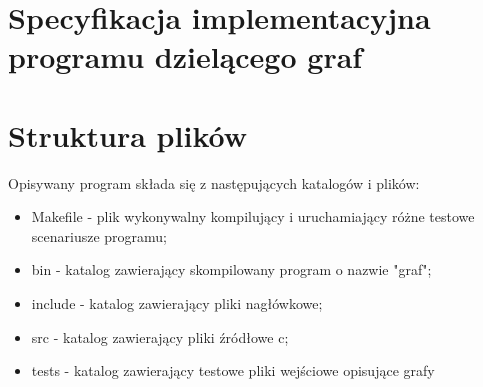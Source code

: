 \documentclass{article}
\begin{document}
\newpage

\section*{\textbf{Specyfikacja implementacyjna programu dzielącego graf}}


\section*{Struktura plików}
Opisywany program składa się z następujących katalogów i plików:
\begin{itemize}
    \item Makefile - plik wykonywalny kompilujący i uruchamiający różne testowe scenariusze programu;
    \item bin - katalog zawierający skompilowany program o nazwie "graf";
    \item include - katalog zawierający pliki nagłówkowe;
    \item src - katalog zawierający pliki źródłowe c;
    \item tests - katalog zawierający testowe pliki wejściowe opisujące grafy
\end{itemize}
\end{document}
